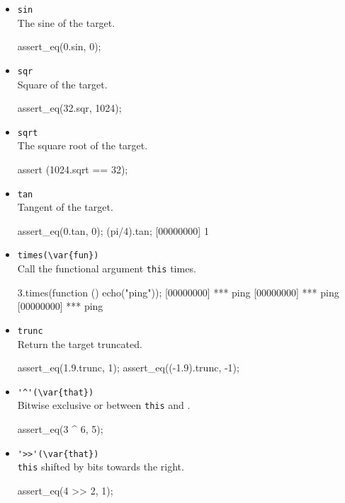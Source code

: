 \begin{itemize}
\item \lstinline|sin|\\
  The sine of the target.
\begin{urbiscript}[firstnumber=last]
assert_eq(0.sin, 0);
\end{urbiscript}

\item \lstinline|sqr|\\
  Square of the target.
\begin{urbiscript}[firstnumber=last]
assert_eq(32.sqr, 1024);
\end{urbiscript}

\item \lstinline|sqrt|\\
  The square root of the target.
\begin{urbiscript}[firstnumber=last]
assert (1024.sqrt == 32);
\end{urbiscript}

\item \lstinline|tan|\\
  Tangent of the target.
\begin{urbiscript}[firstnumber=last]
assert_eq(0.tan, 0);
(pi/4).tan;
[00000000] 1
\end{urbiscript}

\item \lstinline|times(\var{fun})|\\
  Call the functional argument  \lstinline|this| times.

\begin{urbiscript}[firstnumber=last]
3.times(function () { echo("ping")});
[00000000] *** ping
[00000000] *** ping
[00000000] *** ping
\end{urbiscript}

\item \lstinline|trunc|\\
  Return the target truncated.
\begin{urbiscript}[firstnumber=last]
assert_eq(1.9.trunc, 1);
assert_eq((-1.9).trunc, -1);
\end{urbiscript}

\item \lstinline|'^'(\var{that})|\\
  Bitwise exclusive or between \lstinline|this| and .
\begin{urbiscript}[firstnumber=last]
assert_eq(3 ^ 6, 5);
\end{urbiscript}

\item \lstinline|'>>'(\var{that})|\\%
  \lstinline|this| shifted by  bits towards the right.
\begin{urbiscript}[firstnumber=last]
assert_eq(4 >> 2, 1);
\end{urbiscript}


\end{itemize}
